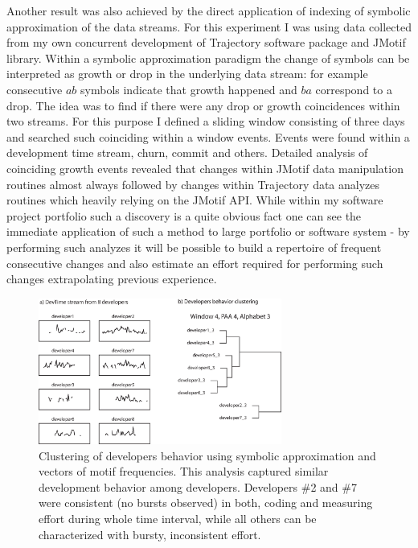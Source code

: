 \documentclass{sig-alternate}
\begin{document}
Another result was also achieved by the direct application of indexing of symbolic approximation of the data streams. For this experiment I was using data collected from my own concurrent development of Trajectory software package and JMotif library. Within a symbolic approximation paradigm the change of symbols can be interpreted as growth or drop in the underlying data stream: for example consecutive $ab$ symbols indicate that growth happened and $ba$ correspond to a drop. The idea was to find if there were any drop or growth coincidences within two streams. For this purpose I defined a sliding window consisting of three days and searched such coinciding within a window events. Events were found within a development time stream, churn, commit and others. Detailed analysis of coinciding growth events revealed that changes within JMotif data manipulation routines almost always followed by changes within Trajectory data analyzes routines which heavily relying on the JMotif API. While within my software project portfolio such a discovery is a quite obvious fact one can see the immediate application of such a method to large portfolio or software system - by performing such analyzes it will be possible to build a repertoire of frequent consecutive changes and also estimate an effort required for performing such changes extrapolating previous experience.

\begin{figure}[tbp]
   \centering
   \includegraphics[height=48mm]{dev_clustering.eps}
   \caption{Clustering of developers behavior using symbolic approximation and vectors of motif frequencies. This analysis captured similar development behavior among developers. Developers \#2 and \#7 were consistent (no bursts observed) in both, coding and measuring effort during whole time interval, while all others can be characterized with bursty, inconsistent effort.}
   \label{fig:cluster_developers}
\end{figure}
\end{document}
